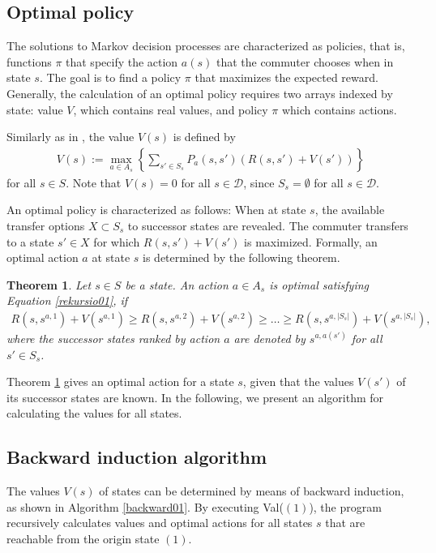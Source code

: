 \documentclass[dissertation,draft*]{aaltoseries}
\newtheorem{theorem}{Theorem}
\begin{document}
\subsection{Optimal policy}
\label{solution}
The solutions to Markov decision processes are characterized as policies, 
that is, functions $\pi$ that specify the action 
$a(s)$ that the commuter chooses when in state $s$. 
The goal is to find a policy $\pi$ that maximizes the expected reward. 
Generally, the calculation of an optimal policy requires two arrays indexed by state: 
value $V$, which contains real values, and policy $\pi$ which contains actions. 

Similarly as in \citep{bellman}, the value $V(s)$ is defined by 
\begin{align}
\label{rekursio01}
V(s) := \max_{a \in A_s} \left\{ \sum_{s' \in S_s} P_a(s,s') \left(R(s,s') +V(s')\right)\right\}
\end{align}
for all $s \in S$. Note that $V(s)=0$ for all $s \in \mathcal{D}$, since $S_s = \emptyset$ for all $s \in \mathcal{D}$.

An optimal policy is characterized as follows:
When at state $s$, the available transfer options $X \subset S_s$ to successor states are revealed.
The commuter transfers to a state $s' \in X$ for which $R(s,s') +V(s')$ is maximized.
Formally, an optimal action $a$ at state $s$ is determined by
the following theorem.

\begin{theorem}
\label{optimalpolicy}
Let $s \in S$ be a state. An action $a \in A_s$ is optimal satisfying Equation \eqref{rekursio01}, if 
\begin{align}
\label{jarjestys}
R(s,s^{a,1})+V(s^{a,1}) \geq R(s,s^{a,2})+V(s^{a,2}) \geq \ldots \geq R(s,s^{a,|S_s|})+V(s^{a,|S_s|}),
\end{align}
where the successor states ranked by action $a$ are denoted by $s^{a,a(s')}$ for all $s' \in S_s$.
\end{theorem}
Theorem \ref{optimalpolicy} gives an optimal action
for a state $s$, given that the values $V(s')$ of its successor states are known.
In the following, we present an algorithm for calculating the values for all states.

\subsection{Backward induction algorithm}
The values $V(s)$ of states can be determined
by means of backward induction, as shown in Algorithm \ref{backward01}.
By executing Val($(1)$), the program recursively calculates values and optimal actions for 
all states $s$ that are reachable from the origin state $(1)$.
\end{document}

